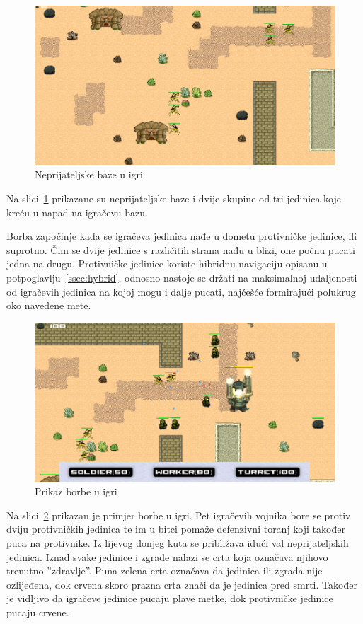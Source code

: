 \documentclass[times, utf8, zavrsni, numeric]{fer}
\begin{document}
\begin{figure}[h]
	\centering
	\includegraphics[width=0.9\linewidth]{images/enemyBases.png}
	\caption{Neprijateljske baze u igri}
	\label{fig:enemyBases}
\end{figure}

\par Na slici~\ref{fig:enemyBases} prikazane su neprijateljske baze i dvije skupine od tri jedinica koje kreću u napad na igračevu bazu.

\par Borba započinje kada se igračeva jedinica nađe u dometu protivničke jedinice, ili suprotno.
Čim se dvije jedinice s različitih strana nađu u blizi, one počnu pucati jedna na drugu.
Protivničke jedinice koriste hibridnu navigaciju opisanu u potpoglavlju~\ref{ssec:hybrid}, odnosno nastoje se držati na maksimalnoj udaljenosti od igračevih jedinica na kojoj mogu i dalje pucati, najčešće formirajući polukrug oko navedene mete.

\begin{figure}[h]
	\centering
	\includegraphics[width=0.9\linewidth]{images/battle.png}
	\caption{Prikaz borbe u igri}
	\label{fig:battle}
\end{figure}

\par Na slici~\ref{fig:battle} prikazan je primjer borbe u igri.
Pet igračevih vojnika bore se protiv dviju protivničkih jedinica te im u bitci pomaže defenzivni toranj koji također puca na protivnike.
Iz lijevog donjeg kuta se približava idući val neprijateljskih jedinica.
Iznad svake jedinice i zgrade nalazi se crta koja označava njihovo trenutno ''zdravlje''.
Puna zelena crta označava da jedinica ili zgrada nije ozlijeđena, dok crvena skoro prazna crta znači da je jedinica pred smrti.
Također je vidljivo da igračeve jedinice pucaju plave metke, dok protivničke jedinice pucaju crvene.
\end{document}
